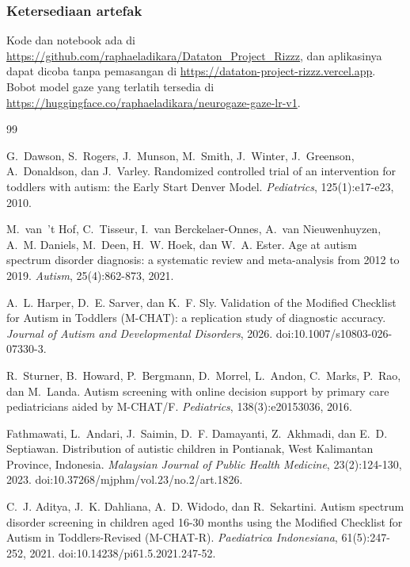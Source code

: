 \documentclass{article}
\begin{document}
\subsubsection*{Ketersediaan artefak}

\begin{sloppypar}
Kode dan notebook ada di
\url{https://github.com/raphaeladikara/Dataton_Project_Rizzz}, dan aplikasinya dapat dicoba
tanpa pemasangan di \url{https://dataton-project-rizzz.vercel.app}. Bobot model gaze
yang terlatih tersedia di
\url{https://huggingface.co/raphaeladikara/neurogaze-gaze-lr-v1}.
\end{sloppypar}

\newpage
\small
\begin{thebibliography}{99}

G.~Dawson, S.~Rogers, J.~Munson, M.~Smith, J.~Winter, J.~Greenson, A.~Donaldson, dan
J.~Varley. Randomized controlled trial of an intervention for toddlers with autism: the Early
Start Denver Model. \emph{Pediatrics}, 125(1):e17-e23, 2010.

M.~van~'t Hof, C.~Tisseur, I.~van Berckelaer-Onnes, A.~van Nieuwenhuyzen, A.~M. Daniels,
M.~Deen, H.~W. Hoek, dan W.~A. Ester. Age at autism spectrum disorder diagnosis: a systematic
review and meta-analysis from 2012 to 2019. \emph{Autism}, 25(4):862-873, 2021.

A.~L. Harper, D.~E. Sarver, dan K.~F. Sly. Validation of the Modified Checklist for Autism in
Toddlers (M-CHAT): a replication study of diagnostic accuracy. \emph{Journal of Autism and
Developmental Disorders}, 2026. doi:10.1007/s10803-026-07330-3.

R.~Sturner, B.~Howard, P.~Bergmann, D.~Morrel, L.~Andon, C.~Marks, P.~Rao, dan M.~Landa.
Autism screening with online decision support by primary care pediatricians aided by
M-CHAT/F. \emph{Pediatrics}, 138(3):e20153036, 2016.

Fathmawati, L.~Andari, J.~Saimin, D.~F. Damayanti, Z.~Akhmadi, dan E.~D. Septiawan.
Distribution of autistic children in Pontianak, West Kalimantan Province, Indonesia.
\emph{Malaysian Journal of Public Health Medicine}, 23(2):124-130, 2023.
doi:10.37268/mjphm/vol.23/no.2/art.1826.

C.~J. Aditya, J.~K. Dahliana, A.~D. Widodo, dan R.~Sekartini. Autism spectrum disorder
screening in children aged 16-30 months using the Modified Checklist for Autism in
Toddlers-Revised (M-CHAT-R). \emph{Paediatrica Indonesiana}, 61(5):247-252, 2021.
doi:10.14238/pi61.5.2021.247-52.


\end{thebibliography}
\end{document}
